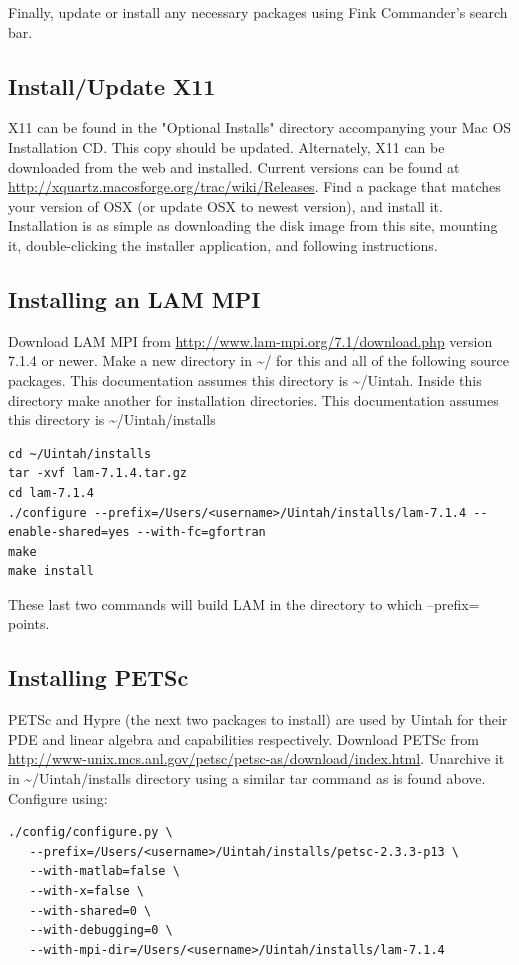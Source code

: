 \documentclass[12pt]{article}
\begin{document}
Finally, update or install any necessary packages using Fink
Commander's search bar.

\subsection{Install/Update X11}
X11 can be found in the "Optional Installs" directory accompanying
your Mac OS Installation CD.  This copy should be updated.
Alternately, X11 can be downloaded from the web and installed.
Current versions can be found at
\url{http://xquartz.macosforge.org/trac/wiki/Releases}.  Find a
package that matches your version of OSX (or update OSX to newest
version), and install it.  Installation is as simple as downloading
the disk image from this site, mounting it, double-clicking the
installer application, and following instructions.

\subsection{Installing an LAM MPI}
Download LAM MPI from \url{http://www.lam-mpi.org/7.1/download.php}
version 7.1.4 or newer.  Make a new directory in \textasciitilde/ for
this and all of the following source packages.  This documentation
assumes this directory is \textasciitilde/Uintah.  Inside this
directory make another for installation directories.  This
documentation assumes this directory is
\textasciitilde/Uintah/installs

\begin{verbatim}
cd ~/Uintah/installs
tar -xvf lam-7.1.4.tar.gz
cd lam-7.1.4
./configure --prefix=/Users/<username>/Uintah/installs/lam-7.1.4 --enable-shared=yes --with-fc=gfortran
make
make install
\end{verbatim}

These last two commands will build LAM in the directory to which
--prefix= points.

\subsection{Installing PETSc}
PETSc and Hypre (the next two packages to install) are used by Uintah
for their PDE and linear algebra and capabilities respectively.
Download PETSc from
\url{http://www-unix.mcs.anl.gov/petsc/petsc-as/download/index.html}.
Unarchive it in \textasciitilde/Uintah/installs directory using a
similar tar command as is found above.  Configure using:

\begin{verbatim}
./config/configure.py \
   --prefix=/Users/<username>/Uintah/installs/petsc-2.3.3-p13 \
   --with-matlab=false \
   --with-x=false \
   --with-shared=0 \
   --with-debugging=0 \
   --with-mpi-dir=/Users/<username>/Uintah/installs/lam-7.1.4
\end{verbatim}
\end{document}

